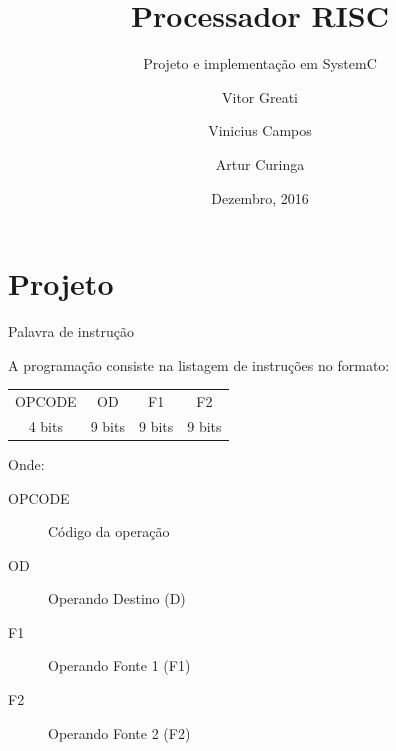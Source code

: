 \documentclass{beamer}
\title{Processador RISC}
\subtitle{Projeto e implementação em SystemC}
\author[Greati,Vinicius,Artur]{Vitor Greati \inst{1} \and Vinicius Campos\inst{1} \and Artur Curinga\inst{1}}
\institute{
	\inst{1}
	Instituto Metrópole Digital\\
	UFRN
}
\date{Dezembro, 2016}
\begin{document}
	\frame{\titlepage}

	\section{Projeto}
		\begin{frame}{Palavra de instrução}

			A programação consiste na listagem de instruções no formato:

			\begin{center}
			\begin{tabular}{|c|c|c|c|}
				\hline
				OPCODE & OD & F1 & F2\\
				4 bits & 9 bits & 9 bits & 9 bits\\
				\hline
			\end{tabular}
			\end{center}
			
			Onde:

			\begin{description}
			    \item [OPCODE] Código da operação
			    \item [OD] Operando Destino (D)
			    \item [F1] Operando Fonte 1 (F1)
			    \item [F2] Operando Fonte 2 (F2)
			\end{description}
		\end{frame}
\end{document}
